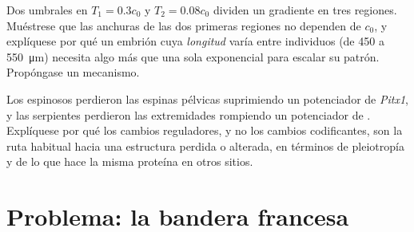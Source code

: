 \begin{exercise}[$\star\star\star$]\label{exo:b3:developmental-genetics:11}
Dos umbrales en $T_{1} = 0.3c_{0}$ y $T_{2} = 0.08c_{0}$ dividen un
gradiente en tres regiones. Muéstrese que las anchuras de las dos
primeras regiones no dependen de $c_{0}$, y explíquese por qué un
embrión cuya \emph{longitud} varía entre individuos (de \qty{450}{} a
\qty{550}{\micro m}) necesita algo más que una sola exponencial para
escalar su patrón. Propóngase un mecanismo.
\end{exercise}

\begin{exercise}[$\star\star\star$]\label{exo:b3:developmental-genetics:12}
Los espinosos perdieron las espinas pélvicas suprimiendo un potenciador
de \emph{Pitx1}, y las serpientes perdieron las extremidades rompiendo
un potenciador de \emph{}. Explíquese por qué los cambios
reguladores, y no los cambios codificantes, son la ruta habitual hacia
una estructura perdida o alterada, en términos de pleiotropía y de lo
que hace la misma proteína en otros sitios.
\end{exercise}

\section{Problema: la bandera francesa}

